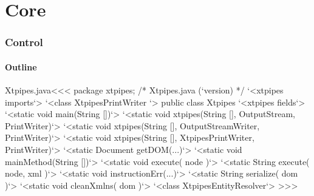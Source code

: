 \documentclass{article}
\begin{document}
{%
\part{Core}


\section{Control}


\subsection{Outline}





 {}{
}




 { 
    \def\BIN{}
}{
    \def\BIN{(/home/4/gurari/xtpipes.dir)}
}

\expandafter\AddFile{}


\<Xtpipes.java\><<<
package xtpipes;
/*
Xtpipes.java (`version)
*/
`<xtpipes imports`>
`<class XtpipesPrintWriter  `>
public class Xtpipes {
   `<xtpipes fields`>
   `<static void main(String [])`>
   `<static void xtpipes(String [], OutputStream, PrintWriter)`>
   `<static void xtpipes(String [], OutputStreamWriter, PrintWriter)`>
   `<static void xtpipes(String [], XtpipesPrintWriter, PrintWriter)`>
   `<static Document getDOM(...)`>
   `<static void mainMethod(String [])`>
   `<static void execute( node )`>
   `<static String execute( node, xml )`>
   `<static void instructionErr(...)`>
   `<static String serialize( dom )`>
   `<static void cleanXmlns( dom )`>
} 
`<class XtpipesEntityResolver`>
>>>

}
\end{document}
